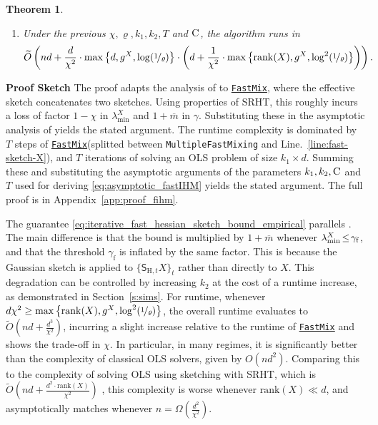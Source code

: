 \documentclass[11pt]{article}
\newtheorem{thm}{Theorem}
\theoremstyle{definition}
\theoremstyle{plain}
\providecommand{\sectionref}[1]{Section~\ref{#1}}
\providecommand{\appendixref}[1]{Appendix~\ref{#1}}
\newcommand{\eps}{{\varepsilon}}
\renewcommand{\eps}{\varepsilon}
\newcommand{\FastMix}{\hyperref[alg:fast_mixing]{\texttt{FastMix}}\xspace}
\begin{document}
\begin{thm}
\begin{enumerate}
\begin{equation}
        \end{equation}
        and $\gamma_{\mathrm{f}} \coloneqq\frac{\sqrt{\max\left\{d, \log\left(\nicefrac{1}{\varrho}\right), g^{X}\right\}\log(\nicefrac{1}{\delta})}\left(1 +  \overline{m}\right)}{\eps}$.
        \item Under the previous $\chi, \varrho, k_1, k_2, T$ and $\textsc{C}$, the algorithm runs in 
        \begin{equation}
            \widetilde{O}\left(nd + \frac{d}{\chi^2}\cdot \max\left\{d, g^{X}, \log(\nicefrac{1}{\varrho})\right\}\cdot \left(d + \frac{1}{\chi^2}\cdot \max\left\{\mathrm{rank}(X), g^{X}, \log^2(\nicefrac{1}{\varrho})\right\}\right)\right).
        \end{equation}
    \end{enumerate}
\end{thm}

\textbf{Proof Sketch} \hskip3mm  The proof adapts the analysis of \citet{lev2026near} to \FastMix, where the effective sketch concatenates two sketches. Using properties of SRHT, this roughly incurs a loss of factor $1-\chi$ in $\lambda_{\min}^{X}$ and $1 + \overline{m}$ in $\gamma$. Substituting these in the asymptotic analysis of \citet{lev2026near} yields the stated argument. The runtime complexity is dominated by $T$ steps of \FastMix (splitted between \texttt{MultipleFastMixing} and Line.~\ref{line:fast-sketch-X}), and $T$ iterations of solving an OLS problem of size $k_1\times d$. Summing these and substituting the asymptotic arguments of the parameters $k_1,k_2,\textsc{C}$ and $T$ used for deriving \eqref{eq:asymptotic_fastIHM} yields the stated argument. The full proof is in \appendixref{app:proof_fihm}.

The guarantee \eqref{eq:iterative_fast_hessian_sketch_bound_empirical} parallels \citep[Theorem.~1]{lev2026near}. The main difference is that the bound is multiplied by $1 + \overline{m}$ whenever $\lambda^{X}_{\min} \hspace{-0.15em}\leq\hspace{-0.15em} \gamma_{\mathrm{f}}$, and that the threshold $\gamma_{\mathrm{f}}$ is inflated by the same factor. This is because the Gaussian sketch is applied to $\{\mathsf{S}_{\mathrm{H}, t}X\}_t$ rather than directly to $X$. This degradation can be controlled by increasing $k_2$ at the cost of a runtime increase, as demonstrated in \sectionref{s:sims}. For runtime, whenever $d\chi^2 \geq \max\left\{\mathrm{rank}(X), g^{X}, \log^2(\nicefrac{1}{\varrho})\right\}$, the overall runtime evaluates to $\widetilde{O}\left(nd + \frac{d^3}{\chi^{2}}\right)$, incurring a slight increase relative to the runtime of \FastMix and shows the trade-off in $\chi$. In particular, in many regimes, it is significantly better than the complexity of classical OLS solvers, given by $O\left(nd^2\right)$. Comparing this to the complexity of solving OLS using sketching with SRHT, which is $\widetilde{O}\left(nd + \frac{d^2 \cdot \mathrm{rank}(X)}{\chi^2}\right)$ \citep[Section.~III.A]{pilanci2015randomized}, this complexity is worse whenever $\mathrm{rank}(X) \ll d$, and asymptotically matches whenever $n=\Omega\left(\frac{d^2}{\chi^2}\right)$.
\end{document}
